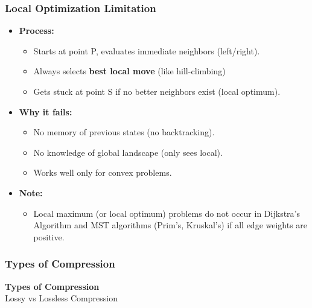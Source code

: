 \documentclass[10pt,aspectratio=43]{beamer}
\begin{document}
\begin{frame}
    \frametitle{Local Optimization Limitation}
  
    \begin{itemize}
        \item \textcolor{myMaroon}{\textbf{Process:}}
        \begin{itemize}
            \item Starts at point P, evaluates immediate neighbors (left/right).
            \item Always selects \textbf{best local move} (like hill-climbing)
            \item Gets stuck at point S if no better neighbors exist (local optimum).
        \end{itemize}

        \vspace{0.5cm}
        
        \item \textcolor{myMaroon}{\textbf{Why it fails:}}
        \begin{itemize}
            \item No memory of previous states (no backtracking).
            \item No knowledge of global landscape (only sees local).
            \item Works well only for convex problems.
        \end{itemize}

        \vspace{0.5cm}

         \item \textcolor{myMaroon}{\textbf{Note:}}
        \begin{itemize}
            \item Local maximum (or local optimum) problems do not occur in Dijkstra's Algorithm and MST algorithms (Prim’s, Kruskal’s) if all edge weights are positive.
        \end{itemize}

    \end{itemize}

\end{frame}






\begin{frame}
    \frametitle{\textcolor{myMaroon}{Types of Compression}}
    \begin{center}
        {\Large \textbf{\textcolor{myMaroon}{Types of Compression}}} \\
        \vspace{0.5cm}
        {\large \textcolor{myBlue}{Lossy vs Lossless Compression}}
    \end{center}

\end{frame}
\end{document}
